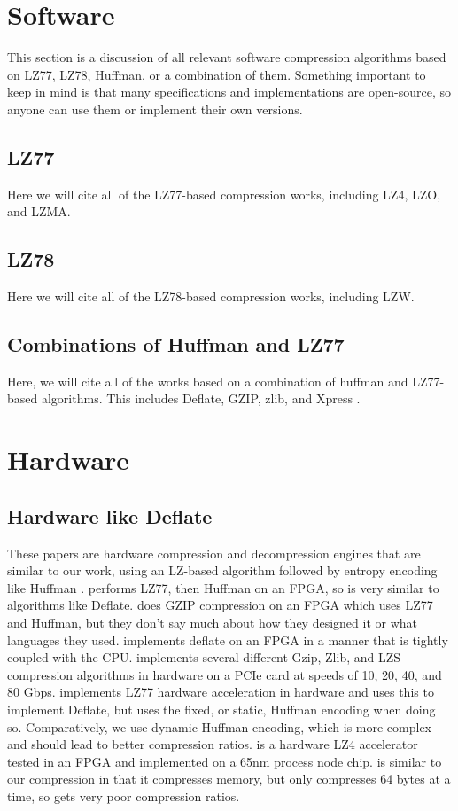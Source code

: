 \documentclass[doublespace,draft,nopageskip]{VTthesis} %
\begin{document}
\section{Software}\label{se:software}
This section is a discussion of all relevant software compression algorithms based on LZ77, LZ78, Huffman, or a combination of them. Something important to keep in mind is that many specifications and implementations are open-source, so anyone can use them or implement their own versions.

\subsection{LZ77}\label{ss:lz77_software}
Here we will cite all of the LZ77-based compression works, including LZ4, LZO, and LZMA.

\subsection{LZ78}\label{ss:lz78_software}
Here we will cite all of the LZ78-based compression works, including LZW.

\subsection{Combinations of Huffman and LZ77}\label{ss:combinations_of_huffman_and_lz77}
Here, we will cite all of the works based on a combination of huffman and LZ77-based algorithms. This includes Deflate, GZIP, zlib, and Xpress \cite{deflate, gzip, zlib, xpress}.

\section{Hardware}\label{se:hardware}
\subsection{Hardware like Deflate}\label{ss:hardware_like_deflate}
These papers are hardware compression and decompression engines that are similar to our work, using an LZ-based algorithm followed by entropy encoding like Huffman \cite{microsoft, ibm}. \cite{xpress9} performs LZ77, then Huffman on an FPGA, so is very similar to algorithms like Deflate. \cite{fpgamulticoregzip} does GZIP compression on an FPGA which uses LZ77 and Huffman, but they don't say much about how they designed it or what languages they used. \cite{fpgadeflate} implements deflate on an FPGA in a manner that is tightly coupled with the CPU.\cite{aha} implements several different Gzip, Zlib, and LZS compression algorithms in hardware on a PCIe card at speeds of 10, 20, 40, and 80 Gbps. \cite{ribeiro} implements LZ77 hardware acceleration in hardware and uses this to implement Deflate, but uses the fixed, or static, Huffman encoding when doing so. Comparatively, we use dynamic Huffman encoding, which is more complex and should lead to better compression ratios. \cite{hardwarelz4} is a hardware LZ4 accelerator tested in an FPGA and implemented on a 65nm process node chip. \cite{compresso} is similar to our compression in that it compresses memory, but only compresses 64 bytes at a time, so gets very poor compression ratios.
\end{document}
